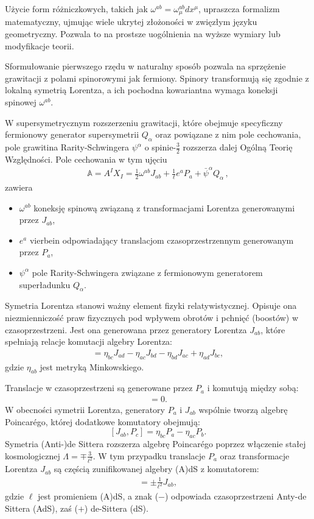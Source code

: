 \documentclass[12pt,a4paper]{article}
\begin{document}
Użycie form różniczkowych, takich jak $\omega^{ab} = \omega^{ab}_\mu dx^\mu$, upraszcza formalizm matematyczny, ujmując wiele ukrytej złożoności w zwięzłym języku geometryczny. Pozwala to na prostsze uogólnienia na wyższe wymiary lub modyfikacje teorii.

Sformułowanie pierwszego rzędu w naturalny sposób pozwala na sprzężenie grawitacji z polami spinorowymi jak fermiony. Spinory transformują się zgodnie z lokalną symetrią Lorentza, a ich pochodna kowariantna wymaga koneksji spinowej $\omega^{ab}$.

W supersymetrycznym rozszerzeniu grawitacji, które obejmuje specyficzny fermionowy generator supersymetrii $Q_{\alpha}$ oraz powiązane z nim pole cechowania, pole grawitina Rarity-Schwingera $\psi^{\alpha}$ o spinie-$\frac{3}{2}$ rozszerza dalej Ogólną Teorię Względności. Pole cechowania w tym ujęciu
\begin{align}
	\mathbb{A} = A^I X_I = \frac{1}{2} \omega^{ab} J_{ab} + \frac{1}{\ell} e^a P_a + \bar{\psi}^{\alpha} Q_{\alpha}\,,
\end{align}
zawiera
\begin{itemize}
	\item $\omega^{ab}$ koneksję spinową związaną z transformacjami Lorentza generowanymi przez $J_{ab}$,
	\item $e^a$ vierbein odpowiadający translacjom czasoprzestrzennym generowanym przez $P_a$,
	\item $\psi^{\alpha}$ pole Rarity-Schwingera związane z fermionowym generatorem superładunku $Q_{\alpha}$.
\end{itemize}

Symetria Lorentza stanowi ważny element fizyki relatywistycznej. Opisuje ona niezmienniczość praw fizycznych pod wpływem obrotów i pchnięć (boostów) w czasoprzestrzeni. Jest ona generowana przez generatory Lorentza $J_{ab}$, które spełniają relacje komutacji algebry Lorentza:
\begin{align}
[J_{ab}, J_{cd}] = \eta_{bc} J_{ad} - \eta_{ac} J_{bd} - \eta_{bd} J_{ac} + \eta_{ad} J_{bc},
\end{align}
gdzie $\eta_{ab}$ jest metryką Minkowskiego.

Translacje w czasoprzestrzeni są generowane przez $P_a$ i komutują między sobą:
\begin{align}
	[P_a, P_b] = 0.
\end{align}
W obecności symetrii Lorentza, generatory $P_a$ i $J_{ab}$ wspólnie tworzą algebrę Poincarégo, której dodatkowe komutatory obejmują:
$$
[J_{ab}, P_c] = \eta_{bc} P_a - \eta_{ac} P_b.
$$
Symetria (Anti-)de Sittera rozszerza algebrę Poincarégo poprzez włączenie stałej kosmologicznej $\Lambda=\mp\frac{3}{\ell^2}$. W tym przypadku translacje $P_a$ oraz transformacje Lorentza $J_{ab}$ są częścią zunifikowanej algebry (A)dS z komutatorem:
\begin{align}
	[P_a, P_b] = \pm \frac{1}{\ell^2} J_{ab},
\end{align}
gdzie $\ell$ jest promieniem (A)dS, a znak ($-$) odpowiada czasoprzestrzeni Anty-de Sittera (AdS), zaś ($+$) de-Sittera (dS).
\end{document}
